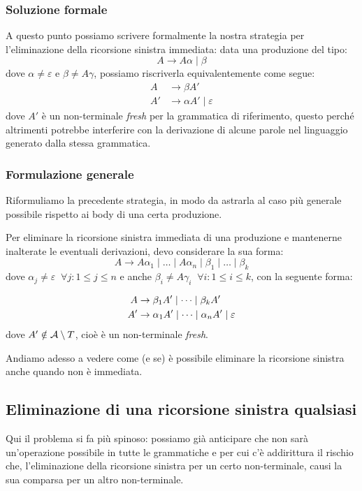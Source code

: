 \documentclass[class=book, crop=false, oneside, 12pt]{standalone}
\begin{document}
\subsubsection{Soluzione formale}
A questo punto possiamo scrivere formalmente la nostra strategia per l'eliminazione della ricorsione sinistra immediata: data una produzione del tipo:
\begin{equation*}
    A \to A \alpha \mid \beta
\end{equation*}
dove \(\alpha \ne \varepsilon\) e \(\beta \ne A \gamma\), possiamo riscriverla equivalentemente come segue:
\begin{align*}
    A &\to \beta A' \\
    A' &\to \alpha A' \mid \varepsilon
\end{align*}
dove \(A'\) è un non-terminale \emph{fresh} per la grammatica di riferimento, questo perché altrimenti potrebbe interferire con la derivazione di alcune parole nel linguaggio generato dalla stessa grammatica.

\subsubsection{Formulazione generale}
\label{subsec:left-recursive-to-ll1}
Riformuliamo la precedente strategia, in modo da astrarla al caso più generale possibile rispetto ai body di una certa produzione.

Per eliminare la ricorsione sinistra immediata di una produzione e mantenerne inalterate le eventuali derivazioni, devo considerare la sua forma:
\begin{equation}
    A \to A \alpha_1 \mid \dots \mid A \alpha_n \mid \beta_1 \mid \dots \mid \beta_k
\end{equation} 
dove \(\alpha_j \ne \varepsilon \;\; \forall j: 1 \le j \le n\) e anche \(\beta_i \ne A \gamma_i \;\; \forall i: 1 \le i \le k\), con la seguente forma:

\begin{align}
    A &\to \beta_1 A' \mid \dots \mid \beta_k A' \\
    A' &\to \alpha_1 A' \mid \dots \mid \alpha_n A' \mid \varepsilon \notag
\end{align}
dove \(A' \notin \mathcal{A} \setminus T\), cioè è un non-terminale \emph{fresh}.

Andiamo adesso a vedere come (e se) è possibile eliminare la ricorsione sinistra anche quando non è immediata.

\subsection{Eliminazione di una ricorsione sinistra qualsiasi}
Qui il problema si fa più spinoso: possiamo già anticipare che non sarà un'operazione possibile in tutte le grammatiche e per cui c'è addirittura il rischio che, l'eliminazione della ricorsione sinistra per un certo non-terminale, causi la sua comparsa per un altro non-terminale.
\end{document}
